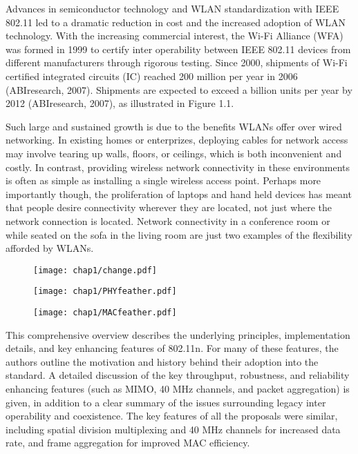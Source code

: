Advances in semiconductor technology and WLAN standardization with IEEE 802.11
led to a dramatic reduction in cost and the increased adoption of WLAN technology.
With the increasing commercial interest, the Wi-Fi Alliance (WFA) was formed in
1999 to certify inter operability between IEEE 802.11 devices from different manufacturers
through rigorous testing. Since 2000, shipments of Wi-Fi certified integrated
circuits (IC) reached 200 million per year in 2006 (ABIresearch, 2007). Shipments are
expected to exceed a billion units per year by 2012 (ABIresearch, 2007), as illustrated in
Figure 1.1.

Such large and sustained growth is due to the benefits WLANs offer over wired
networking. In existing homes or enterprizes, deploying cables for network access may
involve tearing up walls, floors, or ceilings, which is both inconvenient and costly.
In contrast, providing wireless network connectivity in these environments is often as
simple as installing a single wireless access point. Perhaps more importantly though, the
proliferation of laptops and hand held devices has meant that people desire connectivity
wherever they are located, not just where the network connection is located. Network
connectivity in a conference room or while seated on the sofa in the living room are just
two examples of the flexibility afforded by WLANs.

\begin{figure}[!htp]
\centering
\texttt{[image: chap1/change.pdf]}
\end{figure}

\begin{figure}[!htp]
\centering
\texttt{[image: chap1/PHYfeather.pdf]}
\end{figure}

\begin{figure}[!htp]
\centering
\texttt{[image: chap1/MACfeather.pdf]}
\end{figure}

This comprehensive overview describes the underlying principles, implementation details, and key enhancing
features of 802.11n. For many of these features, the authors outline the motivation and
history behind their adoption into the standard. A detailed discussion of the key throughput,
robustness, and reliability enhancing features (such as MIMO, 40 MHz channels,
and packet aggregation) is given, in addition to a clear summary of the issues surrounding
legacy inter operability and coexistence. The key features of all the proposals were similar, including spatial division multiplexing and 40 MHz channels for increased data rate, and frame aggregation for improved
MAC efficiency.
	
